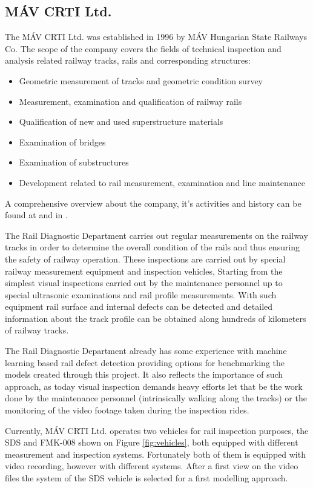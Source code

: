 \subsection{MÁV CRTI Ltd.}
The MÁV CRTI Ltd. was established in 1996 by MÁV Hungarian State Railways Co.
The scope of the company covers the fields of technical inspection and analysis related
railway tracks, rails and corresponding structures:
\begin{itemize}
    \item Geometric measurement of tracks and geometric condition survey
    \item Measurement, examination and qualification of railway rails
    \item Qualification of new and used superstructure materials
    \item Examination of bridges
    \item Examination of substructures
    \item Development related to rail measurement, examination and line maintenance
\end{itemize}

A comprehensive overview about the company, it's activities and history can be found at
\cite{_mav_} and in \cite{kfv_25years}.

The Rail Diagnostic Department carries out regular measurements on the railway tracks in order
to determine the overall condition of the rails and thus ensuring the safety of railway operation.
These inspections are carried out by special railway measurement equipment and inspection vehicles,
Starting from the simplest visual inspections carried out by the maintenance personnel up to
special ultrasonic examinations and rail profile measurements.
With such equipment rail surface and internal defects can be detected and detailed information about
the track profile can be obtained along hundreds of kilometers of railway tracks.

The Rail Diagnostic Department already has some experience with machine learning based rail
defect detection providing options for benchmarking the models created through this project.
It also reflects the importance of such approach, as today visual inspection demands heavy efforts
let that be the work done by the maintenance personnel (intrinsically walking along the tracks)
or the monitoring of the video footage taken during the inspection rides.

Currently, MÁV CRTI Ltd. operates two vehicles for rail inspection purposes, the SDS and FMK-008 shown on
Figure \ref{fig:vehicles}, both equipped with different measurement and inspection systems.
Fortunately both of them is equipped with video recording, however with different systems.
After a first view on the video files the system of the SDS vehicle is selected for a first modelling
approach.

